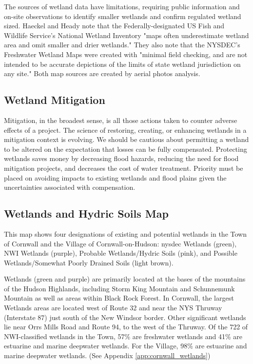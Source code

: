 The sources of wetland data have limitations, requiring public information and 
on-site observations to identify smaller wetlands and confirm regulated wetland 
sized. Haeckel and Heady note that the Federally-designated US Fish and 
Wildlife Service’s National Wetland Inventory "maps often underestimate wetland 
area and omit smaller and drier wetlands." They also note that the NYSDEC's 
Freshwater Wetland Maps were created with "minimal field checking, and are not 
intended to be accurate depictions of the limits of state wetland jurisdiction 
on any site." Both map sources are created by aerial photos analysis.

\subsection*{Wetland Mitigation}
Mitigation, in the broadest sense, is all those actions taken to counter adverse 
effects of a project. The science of restoring, creating, or enhancing wetlands 
in a mitigation context is evolving. We should be cautious about permitting a 
wetland to be altered on the expectation that losses can be fully compensated. 
Protecting wetlands saves money by decreasing flood hazards, reducing the need 
for flood mitigation projects, and decreases the cost of water treatment. 
Priority must be placed on avoiding impacts to existing wetlands and flood 
plains given the uncertainties associated with compensation.

\subsection*{Wetlands and Hydric Soils Map}
This map shows four designations of existing and potential wetlands in the Town 
of Cornwall and the Village of Cornwall-on-Hudson: \gls{nysdec} Wetlands 
(green), NWI Wetlands (purple), Probable Wetlands/Hydric Soils (pink), and 
Possible Wetlands/Somewhat Poorly Drained Soils (light brown). 

Wetlands (green and purple) are primarily located at the bases of the mountains 
of the Hudson Highlands, including Storm King Mountain and Schunnemunk Mountain 
as well as areas within Black Rock Forest. In Cornwall, the largest Wetlands 
areas are located west of Route 32 and near the NYS Thruway (Interstate 87) just 
south of the New Windsor border. Other significant wetlands lie near Orrs Mills 
Road and Route 94, to the west of the Thruway. Of the 722 of NWI-classified 
wetlands in the Town, 57\% are freshwater wetlands and 41\% are estuarine and 
marine deepwater wetlands. For the Village, 98\% are estuarine and marine 
deepwater wetlands. (See Appendix \ref{app:cornwall_wetlands})

